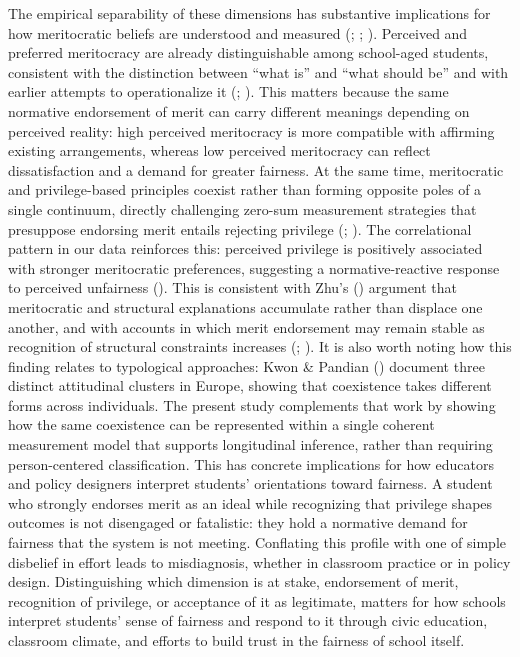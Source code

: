 \documentclass[
  13pt,
]{article}
\begin{document}
The empirical separability of these dimensions has substantive
implications for how meritocratic beliefs are understood and measured
(;
;
). Perceived and
preferred meritocracy are already distinguishable among school-aged
students, consistent with the distinction between ``what is'' and ``what
should be'' and with earlier attempts to operationalize it
(;
). This
matters because the same normative endorsement of merit can carry
different meanings depending on perceived reality: high perceived
meritocracy is more compatible with affirming existing arrangements,
whereas low perceived meritocracy can reflect dissatisfaction and a
demand for greater fairness. At the same time, meritocratic and
privilege-based principles coexist rather than forming opposite poles of
a single continuum, directly challenging zero-sum measurement strategies
that presuppose endorsing merit entails rejecting privilege
(;
). The
correlational pattern in our data reinforces this: perceived privilege
is positively associated with stronger meritocratic preferences,
suggesting a normative-reactive response to perceived unfairness
().
This is consistent with Zhu's
() argument that meritocratic
and structural explanations accumulate rather than displace one another,
and with accounts in which merit endorsement may remain stable as
recognition of structural constraints increases
(;
). It is also
worth noting how this finding relates to typological approaches: Kwon \&
Pandian () document
three distinct attitudinal clusters in Europe, showing that coexistence
takes different forms across individuals. The present study complements
that work by showing how the same coexistence can be represented within
a single coherent measurement model that supports longitudinal
inference, rather than requiring person-centered classification. This
has concrete implications for how educators and policy designers
interpret students' orientations toward fairness. A student who strongly
endorses merit as an ideal while recognizing that privilege shapes
outcomes is not disengaged or fatalistic: they hold a normative demand
for fairness that the system is not meeting. Conflating this profile
with one of simple disbelief in effort leads to misdiagnosis, whether in
classroom practice or in policy design. Distinguishing which dimension
is at stake, endorsement of merit, recognition of privilege, or
acceptance of it as legitimate, matters for how schools interpret
students' sense of fairness and respond to it through civic education,
classroom climate, and efforts to build trust in the fairness of school
itself.
\end{document}
